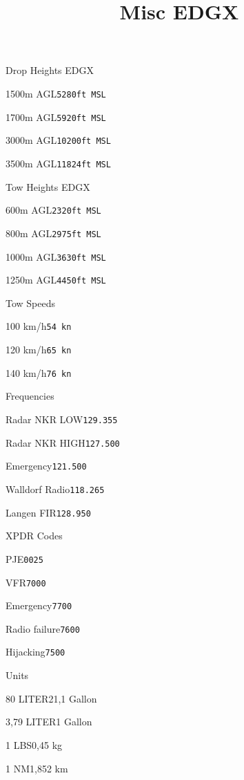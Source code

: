\def\papersize{6}




\title{Misc EDGX}

\begin{checklist}{Drop Heights EDGX}
    \item{1500m AGL}{\texttt{5280ft MSL}}
    \item{1700m AGL}{\texttt{5920ft MSL}}
    \item{3000m AGL}{\texttt{10200ft MSL}}
    \item{3500m AGL}{\texttt{11824ft MSL}}
  \end{checklist}

\begin{checklist}{Tow Heights EDGX}
    \item{600m AGL}{\texttt{2320ft MSL}}
    \item{800m AGL}{\texttt{2975ft MSL}}
    \item{1000m AGL}{\texttt{3630ft MSL}}
    \item{1250m AGL}{\texttt{4450ft MSL}}
  \end{checklist}
  
  \begin{checklist}{Tow Speeds}
    \item{100 km/h}{\texttt{54 kn}}
    \item{120 km/h}{\texttt{65 kn}}
    \item{140 km/h}{\texttt{76 kn}}
  \end{checklist}
  
  \begin{checklist}{Frequencies}
    \item{Radar NKR LOW}{\texttt{129.355}}
    \item{Radar NKR HIGH}{\texttt{127.500}}
    \item{Emergency}{\texttt{121.500}}
    \item{Walldorf Radio}{\texttt{118.265}}
    \item{Langen FIR}{\texttt{128.950}}
  \end{checklist}
  
  \begin{checklist}{XPDR Codes}
    \item{PJE}{\texttt{0025}}
    \item{VFR}{\texttt{7000}}
    \item{Emergency}{\texttt{7700}}
    \item{Radio failure}{\texttt{7600}}
    \item{Hijacking}{\texttt{7500}}
  \end{checklist}
  
  \begin{checklist}{Units}
    \item{80 LITER}{21,1 Gallon}
    \item{3,79 LITER}{1 Gallon}
    \item{1 LBS}{0,45 kg}
    \item{1 NM}{1,852 km}
  \end{checklist}
